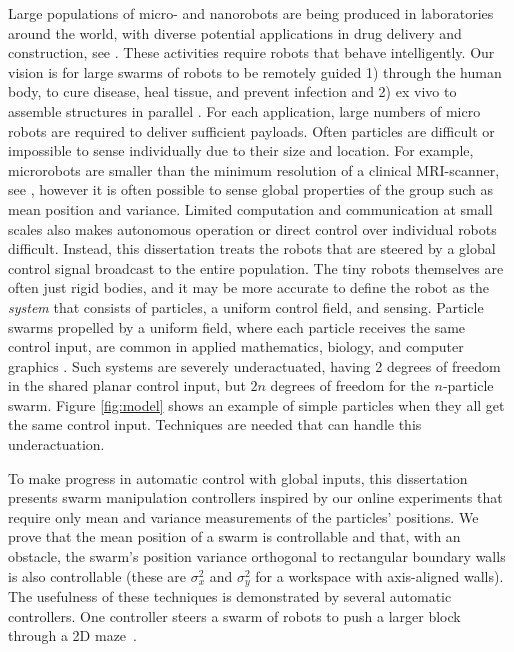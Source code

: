 Large populations of micro- and nanorobots are being produced in laboratories around the world, with diverse potential applications in drug delivery and construction, see \cite{Peyer2013,Shirai2005,Chiang2011}. These activities require robots that behave intelligently.
Our vision is for large swarms of robots to be remotely guided 1) through the human body, to cure disease, heal tissue, and prevent infection and 2) ex vivo to assemble structures in parallel \cite{nelson2010microrobots}. 
 For each application, large numbers of micro robots are required  to deliver sufficient payloads.
 Often particles are difficult or impossible to sense individually due to their size and location. 
For example, microrobots are smaller than the minimum resolution of a clinical MRI-scanner, see \cite{martel2014computer}, however it is often possible to sense global properties of the group such as mean position and variance. 
 Limited computation and communication at small scales also makes autonomous operation or direct control over individual robots difficult. 
  Instead, this dissertation treats the robots that are steered by a global control signal broadcast to the entire population. 
  The tiny robots themselves are often just rigid bodies, and it may be more accurate to define the robot as the \emph{system} that consists of particles, a uniform control field, and sensing.
 Particle swarms propelled by a uniform field, where each particle  receives the same control input, are common in applied mathematics, biology, and computer graphics \cite{Peyer2013,Shirai2005,Chiang2011}. 
Such systems are severely underactuated, having 2 degrees of freedom in the shared planar control input, but $2n$ degrees of freedom for the $n$-particle swarm. Figure \ref{fig:model} shows an example of simple particles when they all get the same control input.
 Techniques are needed that can handle this underactuation.  
 
 To make progress in automatic control with global inputs, this dissertation presents swarm manipulation controllers inspired by our online experiments that require only mean and variance measurements of the particles' positions. 
We prove that the mean position of a swarm is controllable and that, with an obstacle, the swarm's position variance orthogonal to rectangular boundary walls  is also controllable
(these are $\sigma_x^2$ and $\sigma_y^2$ for a workspace with axis-aligned walls). 
The usefulness of these techniques is demonstrated by several automatic controllers. One controller steers a swarm of robots to push a larger block through a 2D maze~\cite{ShahrokhiIROS2015}. 

